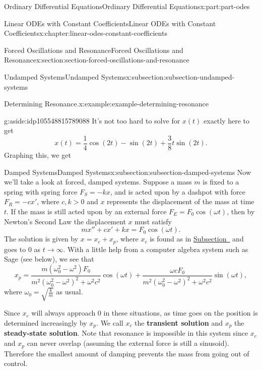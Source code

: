 \documentclass[twoside,10pt,]{book}
\newcommand{\terminology}[1]{\textbf{#1}}
\numberwithin{equation}{part}
\newcommand{\gt}{>}
\begin{document}
\begin{partptx}{Ordinary Differential Equations}{}{Ordinary Differential Equations}{}{}{x:part:part-odes}
\begin{chapterptx}{Linear ODEs with Constant Coefficients}{}{Linear ODEs with Constant Coefficients}{}{}{x:chapter:linear-odes-constant-coefficients}
\begin{sectionptx}{Forced Oscillations and Resonance}{}{Forced Oscillations and Resonance}{}{}{x:section:section-forced-oscillations-and-resonance}
\begin{subsectionptx}{Undamped Systems}{}{Undamped Systems}{}{}{x:subsection:subsection-undamped-systems}
\begin{example}{Determining Resonance.}{x:example:example-determining-resonance}
\end{example}
\begin{aside}{}{g:aside:idp105548815789088}%
It's not too hard to solve for \(x(t)\) exactly here to get%
\begin{equation*}
x(t) = \frac{1}{4}\cos(2t) - \sin(2t) + \frac{3}{8}t\sin(2t).
\end{equation*}
Graphing this, we get%
\end{aside}
\end{subsectionptx}
%
%
\typeout{************************************************}
\typeout{************************************************}
%
\begin{subsectionptx}{Damped Systems}{}{Damped Systems}{}{}{x:subsection:subsection-damped-systems}
Now we'll take a look at forced, damped systems. Suppose a mass \(m\) is fixed to a spring with spring force \(F_{S} = -kx\), and is acted upon by a dashpot with force \(F_{R} = -cx'\), where \(c,k \gt 0\) and \(x\) represents the displacement of the mass at time \(t\). If the mass is still acted upon by an external force \(F_{E} = F_{0}\cos(\omega t)\), then by Newton's Second Law the displacement \(x\) must satisfy%
\begin{equation*}
mx'' + cx' + kx = F_{0}\cos(\omega t).
\end{equation*}
The solution is given by \(x = x_{c} + x_{p}\), where \(x_{c}\) is found as in \hyperref[x:subsection:subsection-free-damped-motion]{Subsection~} and goes to \(0\) as \(t\to\infty\). With a little help from a computer algebra system such as Sage (see below), we see that%
\begin{equation*}
x_{p} = \frac{m(\omega_{0}^{2} - \omega^{2})F_{0}}{m^{2}(\omega_{0}^{2} - \omega^{2})^{2} + \omega^{2}c^{2}}\cos(\omega t) + \frac{\omega c F_{0}}{m^{2}(\omega_{0}^{2} - \omega^{2})^{2} + \omega^{2}c^{2}}\sin(\omega t),
\end{equation*}
where \(\omega_{0} = \sqrt{\frac{k}{m}}\) as usual.%
\par
Since \(x_{c}\) will always approach \(0\) in these situations, as time goes on the position is determined increasingly by \(x_{p}\). We call \(x_{c}\) the \terminology{transient solution} and \(x_{p}\) the \terminology{steady-state solution}. Note that resonance is impossible in this system since \(x_{c}\) and \(x_{p}\) can never overlap (assuming the external force is still a sinusoid). Therefore the smallest amount of damping prevents the mass from going out of control.%
\begin{sageinput}

\end{sageinput}
\end{subsectionptx}
\end{sectionptx}
\end{chapterptx}
\end{partptx}
\end{document}
